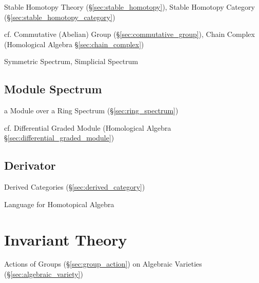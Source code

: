 
Stable Homotopy Theory (\S\ref{sec:stable_homotopy}), Stable Homotopy Category
(\S\ref{sec:stable_homotopy_category})

cf. Commutative (Abelian) Group (\S\ref{sec:commutative_group}), Chain Complex
(Homological Algebra \S\ref{sec:chain_complex})

Symmetric Spectrum, Simplicial Spectrum



\subsection{Module Spectrum}\label{sec:module_spectrum}

a Module over a Ring Spectrum (\S\ref{sec:ring_spectrum})

cf. Differential Graded Module (Homological Algebra
\S\ref{sec:differential_graded_module})



\subsection{Derivator}\label{sec:derivator}

Derived Categories (\S\ref{sec:derived_category})

Language for Homotopical Algebra



\section{Invariant Theory}\label{sec:invariant_theory}

Actions of Groups (\S\ref{sec:group_action}) on Algebraic Varieties
(\S\ref{sec:algebraic_variety})
